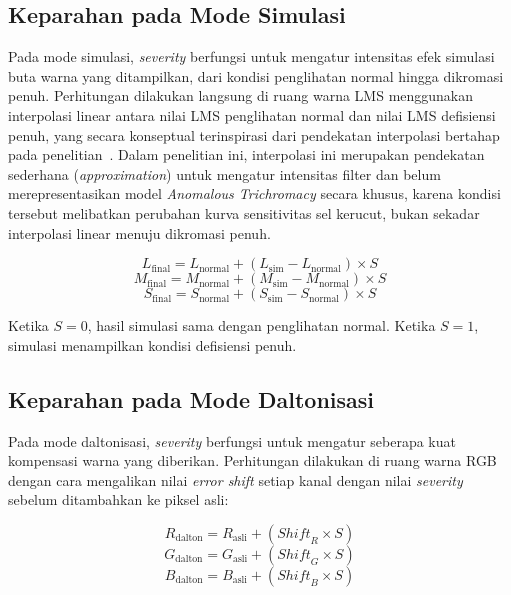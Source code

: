\subsection{Keparahan pada Mode Simulasi}

Pada mode simulasi, \textit{severity} berfungsi untuk mengatur intensitas efek simulasi buta warna yang ditampilkan, dari kondisi penglihatan normal hingga dikromasi penuh.
Perhitungan dilakukan langsung di ruang warna LMS menggunakan interpolasi linear antara nilai LMS penglihatan normal dan nilai LMS defisiensi penuh, yang secara konseptual terinspirasi dari pendekatan interpolasi bertahap pada penelitian~\textcite{physiologically_visualization}.
Dalam penelitian ini, interpolasi ini merupakan pendekatan sederhana (\textit{approximation}) untuk mengatur intensitas filter dan belum merepresentasikan model \textit{Anomalous Trichromacy} secara khusus, karena kondisi tersebut melibatkan perubahan kurva sensitivitas sel kerucut, bukan sekadar interpolasi linear menuju dikromasi penuh.

\begin{equation}
  L_{\text{final}} = L_{\text{normal}} + (L_{\text{sim}} - L_{\text{normal}}) \times S
\end{equation}
\begin{equation}
  M_{\text{final}} = M_{\text{normal}} + (M_{\text{sim}} - M_{\text{normal}}) \times S
\end{equation}
\begin{equation}
  S_{\text{final}} = S_{\text{normal}} + (S_{\text{sim}} - S_{\text{normal}}) \times S
  \label{eq:severity-sim}
\end{equation}

Ketika $S = 0$, hasil simulasi sama dengan penglihatan normal. Ketika $S = 1$, simulasi menampilkan kondisi defisiensi penuh.

\subsection{Keparahan pada Mode Daltonisasi}

Pada mode daltonisasi, \textit{severity} berfungsi untuk mengatur seberapa kuat kompensasi warna yang diberikan.
Perhitungan dilakukan di ruang warna RGB dengan cara mengalikan nilai \textit{error shift} setiap kanal dengan nilai \textit{severity} sebelum ditambahkan ke piksel asli:

\begin{equation}
  R_{\text{dalton}} = R_{\text{asli}} + (\mathit{Shift}_R \times S)
\end{equation}
\begin{equation}
  G_{\text{dalton}} = G_{\text{asli}} + (\mathit{Shift}_G \times S)
\end{equation}
\begin{equation}
  B_{\text{dalton}} = B_{\text{asli}} + (\mathit{Shift}_B \times S)
  \label{eq:severity-corr}
\end{equation}


